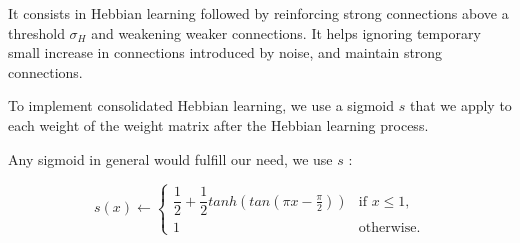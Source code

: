 \documentclass[journal]{IEEEtran}
\begin{document}
It consists in Hebbian learning followed by reinforcing strong connections above a threshold $\sigma_{H}$ and weakening weaker connections. It helps ignoring temporary small increase in connections introduced by noise, and maintain strong connections.  

To implement consolidated Hebbian learning, we use a sigmoid $s$ that we apply to each weight of the weight matrix after the Hebbian learning process. 

Any sigmoid in general would fulfill our need, we use $s$ :

\begin{equation}
s(x) \leftarrow \left\{\begin{array}{ll} \dfrac{1}{2} + \dfrac{1}{2}tanh(tan(\pi x-\frac{\pi}{2})) & \mbox {if } x \leq 1, \\
 1 & \mbox {otherwise.}\end{array}\right.
\end{equation}
\end{document}
